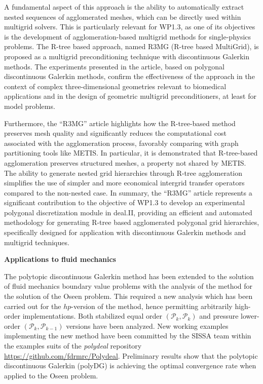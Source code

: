 \documentclass[a4paper,12pt, numbers]{article}
\begin{document}
A fundamental aspect of this approach is the ability to automatically extract
nested sequences of agglomerated meshes, which can be directly used within
multigrid solvers. This is particularly relevant for WP1.3, as one of its
objectives is the development of agglomeration-based multigrid methods for
single-physics problems. The R-tree based approach, named R3MG (R-tree based
MultiGrid), is proposed as a multigrid preconditioning technique with
discontinuous Galerkin methods. The experiments presented in the article, based
on polygonal discontinuous Galerkin methods, confirm the effectiveness of the
approach in the context of complex three-dimensional geometries relevant to biomedical applications and in the
design of geometric multigrid preconditioners, at least for model problems.

Furthermore, the ``R3MG'' article highlights how the R-tree-based method preserves
mesh quality and significantly reduces the computational cost associated with
the agglomeration process, favorably comparing with graph partitioning tools
like METIS. In particular, it is demonstrated that R-tree-based agglomeration
preserves structured meshes, a property not shared by METIS. The ability to
generate nested grid hierarchies through R-tree agglomeration simplifies the use
of simpler and more economical intergrid transfer operators compared to the
non-nested case. In summary, the ``R3MG'' article represents a significant
contribution to the objective of WP1.3 to develop an experimental polygonal
discretization module in deal.II, providing an efficient and automated
methodology for generating R-tree based agglomerated polygonal grid hierarchies,
specifically designed for application with discontinuous Galerkin methods and
multigrid techniques.

\noindent\textbf{Applications to fluid mechanics}

The polytopic discontinuous Galerkin method has been extended to the solution of fluid mechanics boundary value problems with the analysis of the method for the solution of the Oseen problem. This required a new analysis which has been carried out for the $hp$-version of the method, hence permitting arbitrarily high-order implementations. Both stabilized equal order $(\mathcal{P}_k,\mathcal{P}_{k})$ and pressure lower-order $(\mathcal{P}_k,\mathcal{P}_{k-1})$ versions have been analyzed. 
New working examples implementing the new method have been committed by the SISSA team within the examples suits of the {\em polydeal} repository \url{https://github.com/fdrmrc/Polydeal}. Preliminary results show that the polytopic discontinuous Galerkin (polyDG) is achieving the optimal convergence rate when applied to the Oseen problem. 
\end{document}
